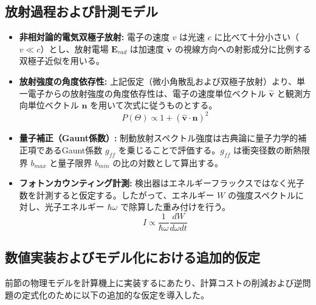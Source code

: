 \documentclass[a4paper,11pt]{bxjsarticle} %
\begin{document}
\subsection{放射過程および計測モデル}
\begin{itemize}
    \item \textbf{非相対論的電気双極子放射:}
    電子の速度 $v$ は光速 $c$ に比べて十分小さい（$v \ll c$）とし、放射電場 $\mathbf{E}_{rad}$ は加速度 $\dot{\mathbf{v}}$ の視線方向への射影成分に比例する双極子近似を用いる。
    
    \item \textbf{放射強度の角度依存性:}
    上記仮定（微小角散乱および双極子放射）より、単一電子からの放射強度の角度依存性は、電子の速度単位ベクトル $\hat{\mathbf{v}}$ と観測方向単位ベクトル $\mathbf{n}$ を用いて次式に従うものとする。
    \begin{equation}
        P(\Theta) \propto 1 + (\hat{\mathbf{v}} \cdot \mathbf{n})^2
    \end{equation}
    
    \item \textbf{量子補正（Gaunt係数）:}
    制動放射スペクトル強度は古典論に量子力学的補正項であるGaunt係数 $g_{ff}$ を乗じることで評価する。$g_{ff}$ は衝突径数の断熱限界 $b_{max}$ と量子限界 $b_{min}$ の比の対数として算出する。
    
    \item \textbf{フォトンカウンティング計測:}
    検出器はエネルギーフラックスではなく光子数を計測すると仮定する。したがって、エネルギー $W$ の強度スペクトルに対し、光子エネルギー $\hbar\omega$ で除算した重み付けを行う。
    \begin{equation}
        I \propto \frac{1}{\hbar\omega} \frac{dW}{d\omega dt}
    \end{equation}
\end{itemize}

\subsection{数値実装およびモデル化における追加的仮定}
前節の物理モデルを計算機上に実装するにあたり、計算コストの削減および逆問題の定式化のために以下の追加的な仮定を導入した。
\end{document}
